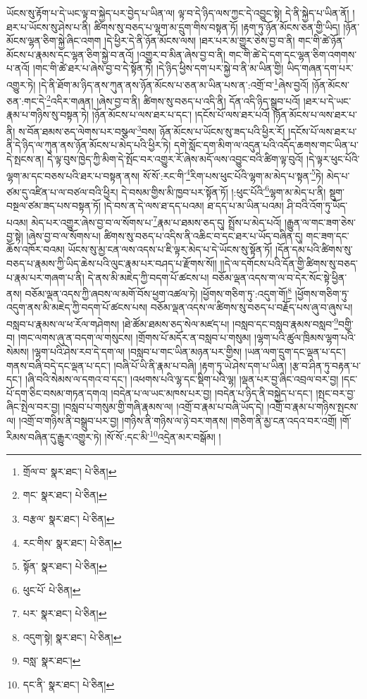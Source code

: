 ཡོངས་སུ་རྟོག་པ་དེ་ཡང་ལྟ་བ་སྐྱེད་པར་བྱེད་པ་ཡིན་ལ། ལྟ་བ་དེ་ཉིད་ལས་ཀྱང་དེ་འབྱུང་སྟེ། དེ་ནི་སྐྱེད་པ་ཡིན་ནོ། །ཐར་པ་ཡོངས་སུ་ཤེས་པ་ནི། ཚིགས་སུ་བཅད་པ་ལྷག་མ་དྲུག་གིས་བསྟན་ཏོ། །རྟག་ཏུ་ཉོན་མོངས་ཅན་གྱི་ཡིད། །ཉོན་མོངས་ལྷན་ཅིག་སྐྱེ་ཞིང་འགག །དེ་ཕྱིར་དེ་ནི་ཉོན་མོངས་ལས། །ཐར་པར་མ་གྱུར་ཅེས་བྱ་བ་ནི། གང་གི་ཚེ་ཉོན་མོངས་པ་རྣམས་དང་ལྷན་ཅིག་སྐྱེ་བ་ནའོ། །འགྱུར་བ་མིན་ཞེས་བྱ་བ་ནི། གང་གི་ཚེ་དེ་དག་དང་ལྷན་ཅིག་འགགས་པ་ནའོ། །གང་གི་ཚེ་ཐར་པ་ཞེས་བྱ་བ་དེ་སྟོན་ཏེ། །དེ་ཉིད་ཕྱིས་དག་པར་སྐྱེ་བ་ནི་མ་ཡིན་གྱི། ཡིད་གཞན་དག་པར་འགྱུར་ཏེ། །དེ་ནི་ཐོག་མ་ཉིད་ནས་ཀུན་ནས་ཉོན་མོངས་པ་ཅན་མ་ཡིན་པས་ན་:འགྲོ་བ་\footnote{གྲོལ་བ་  སྣར་ཐང་།  པེ་ཅིན། }ཞེས་བྱའོ། །ཉོན་མོངས་ཅན་:གང་དེ་\footnote{གང་  སྣར་ཐང་།  པེ་ཅིན། }འདིར་གཞན། །ཞེས་བྱ་བ་ནི། ཚིགས་སུ་བཅད་པ་འདི་ནི། དོན་འདི་ཉིད་སྒྲུབ་པའོ། །ཐར་པ་དེ་ཡང་རྣམ་པ་གཉིས་སུ་བསྟན་ཏེ། །ཉོན་མོངས་པ་ལས་ཐར་པ་དང་། །དངོས་པོ་ལས་ཐར་པའོ། །ཉོན་མོངས་པ་ལས་ཐར་པ་ནི། ས་བོན་ཐམས་ཅད་ལེགས་པར་བསྩལ་\footnote{བརྩལ་  སྣར་ཐང་།  པེ་ཅིན། }བས། ཉོན་མོངས་པ་ཡོངས་སུ་ཟད་པའི་ཕྱིར་རོ། །དངོས་པོ་ལས་ཐར་པ་ནི་དེ་ཉིད་ལ་ཀུན་ནས་ཉོན་མོངས་པ་མེད་པའི་ཕྱིར་ཏེ། དགེ་སློང་དག་མིག་ལ་འདུན་པའི་འདོད་ཆགས་གང་ཡིན་པ་དེ་སྤངས་ན། དེ་ལྟ་བུས་ཁྱེད་ཀྱི་མིག་དེ་སྤོང་བར་འགྱུར་རོ་ཞེས་མདོ་ལས་འབྱུང་བའི་ཚིག་ལྟ་བུའོ། །དེ་ལྟར་ཕུང་པོའི་ལྷག་མ་དང་བཅས་པའི་ཐར་པ་བསྟན་ནས། སོ་སོ་:རང་གི་\footnote{རང་གིས་  སྣར་ཐང་།  པེ་ཅིན། }རིག་པས་ཕུང་པོའི་ལྷག་མ་མེད་པ་སྟན་\footnote{སྟོན་  སྣར་ཐང་།  པེ་ཅིན། }ཏེ། མེད་པ་ཙམ་དུ་འཛིན་པ་ལ་བཙལ་བའི་ཕྱིར། དེ་བསམ་གྱིས་མི་ཁྱབ་པར་སྟོན་ཏོ། །:ཕུང་པོའི་\footnote{ཕུང་པོ་  པེ་ཅིན། }ལྷག་མ་མེད་པ་ནི། སྡུག་བསྔལ་ཙམ་ཟད་པས་བསྟན་ཏོ། །དེ་བས་ན་དེ་ལས་ཐ་དད་པའམ། ཐ་དད་པ་མ་ཡིན་པའམ། ཤི་བའི་འོག་ཏུ་ཡོད་པའམ། མེད་པར་འགྱུར་ཞེས་བྱ་བ་ལ་སོགས་པ་\footnote{པར་  སྣར་ཐང་།  པེ་ཅིན། }རྣམ་པ་ཐམས་ཅད་དུ། སྤྲོས་པ་མེད་པའོ། །རྒྱུན་ལ་གང་ཟག་ཅེས་བྱ་སྟེ། །ཞེས་བྱ་བ་ལ་སོགས་པ། ཚིགས་སུ་བཅད་པ་འདིས་ནི་འཆིང་བ་དང་ཐར་པ་ཡོད་བཞིན་དུ། གང་ཟག་དང་ཆོས་འཁོར་བའམ། ཡོངས་སུ་མྱ་ངན་ལས་འདས་པ་ཇི་ལྟར་མེད་པ་དེ་ཡོངས་སུ་སྟོན་ཏོ། །དོན་དམ་པའི་ཚིགས་སུ་བཅད་པ་རྣམས་ཀྱི་ཡིད་ཆེས་པའི་ལུང་རྣམ་པར་བཤད་པ་རྫོགས་སོ།། །།དེ་ལ་དགོངས་པའི་དོན་གྱི་ཚིགས་སུ་བཅད་པ་རྣམ་པར་གཞག་པ་ནི། དེ་ནས་མི་མཇེད་ཀྱི་བདག་པོ་ཚངས་པ། བཅོམ་ལྡན་འདས་ག་ལ་བ་དེར་སོང་སྟེ་ཕྱིན་ནས། བཅོམ་ལྡན་འདས་ཀྱི་ཞབས་ལ་མགོ་བོས་ཕྱག་འཚལ་ཏེ། །ཕྱོགས་གཅིག་ཏུ་:འདུག་གོ།\footnote{འདུག་སྟེ།  སྣར་ཐང་།  པེ་ཅིན། } །ཕྱོགས་གཅིག་ཏུ་འདུག་ནས་མི་མཇེད་ཀྱི་བདག་པོ་ཚངས་པས། བཅོམ་ལྡན་འདས་ལ་ཚིགས་སུ་བཅད་པ་བརྗོད་པས་ཞུ་བ་ཞུས་པ། བསླབ་པ་རྣམས་ལ་ཕ་རོལ་གཤེགས། །ཐེ་ཚོམ་ཐམས་ཅད་སེལ་མཛད་པ། །བསླབ་དང་བསླབ་རྣམས་བསླབ་\footnote{བསླ་  སྣར་ཐང་། }བགྱི་བ། །གང་ལགས་ཞུ་ན་བདག་ལ་གསུངས། །གྲོགས་པོ་མདོར་ན་བསླབ་པ་གསུམ། །ལྷག་པའི་ཚུལ་ཁྲིམས་ལྷག་པའི་སེམས། །ལྷག་པའི་ཤེས་རབ་དེ་དག་ལ། །བསླབ་པ་གང་ཡིན་མཉན་པར་གྱིས། །ཡན་ལག་དྲུག་དང་ལྡན་པ་དང་། གནས་བཞི་བདེ་དང་ལྡན་པ་དང་། །བཞི་པོ་ཡི་ནི་རྣམ་པ་བཞི། །རྟག་ཏུ་ཡེ་ཤེས་དག་པ་ཡིན། །རྩ་བ་ཤིན་ཏུ་བརྟན་པ་དང་། །ཞི་བའི་སེམས་ལ་དགའ་བ་དང་། །འཕགས་པའི་ལྷ་དང་སྡིག་པའི་ལྷ། །ལྡན་པར་བྱ་ཞིང་འབྲལ་བར་བྱ། །དང་པོ་དག་ཅིང་བསམ་གཏན་དགའ། །བདེན་པ་ལ་ཡང་མཁས་པར་བྱ། །བདེན་པ་ཉིད་ནི་བསྐྱེད་པ་དང་། །སྤང་བར་བྱ་ཞིང་སྤེལ་བར་བྱ། །བསླབ་པ་གསུམ་གྱི་གཞི་རྣམས་ལ། །འགྲོ་བ་རྣམ་པ་བཞི་ཡོད་དེ། །འགྲོ་བ་རྣམ་པ་གཉིས་སྤངས་ལ། །འགྲོ་བ་གཉིས་ནི་བསྒྲུབ་པར་བྱ། །གཉིས་ནི་གཉིས་ལ་ཉེ་བར་གནས། །གཅིག་ནི་མྱ་ངན་འདའ་བར་འགྲོ། །གོ་རིམས་བཞིན་དུ་རྒྱུར་འགྱུར་ཏེ། །སོ་སོ་:དང་མི་\footnote{དང་ནི་  སྣར་ཐང་།  པེ་ཅིན། }འདྲེན་མར་བསྒོམ། །
